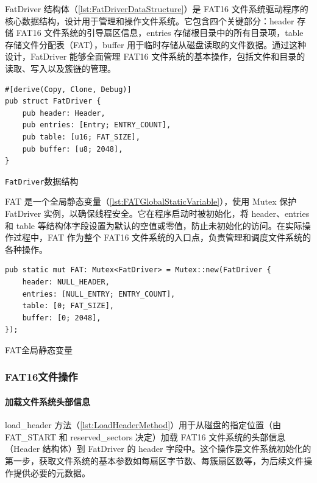 FatDriver 结构体（\cref{lst:FatDriverDataStructure}）是 FAT16 文件系统驱动程序的核心数据结构，设计用于管理和操作文件系统。它包含四个关键部分：header 存储 FAT16 文件系统的引导扇区信息，entries 存储根目录中的所有目录项，table 存储文件分配表（FAT），buffer 用于临时存储从磁盘读取的文件数据。通过这种设计，FatDriver 能够全面管理 FAT16 文件系统的基本操作，包括文件和目录的读取、写入以及簇链的管理。

\begin{listing}[htbp]
    \begin{verbatim}
#[derive(Copy, Clone, Debug)]
pub struct FatDriver {
    pub header: Header,
    pub entries: [Entry; ENTRY_COUNT],
    pub table: [u16; FAT_SIZE],
    pub buffer: [u8; 2048],
}
    \end{verbatim}
    \caption{\texttt{FatDriver}数据结构}\label{lst:FatDriverDataStructure}
\end{listing}

FAT 是一个全局静态变量（\cref{lst:FATGlobalStaticVariable}），使用 Mutex 保护 FatDriver 实例，以确保线程安全。它在程序启动时被初始化，将 header、entries 和 table 等结构体字段设置为默认的空值或零值，防止未初始化的访问。在实际操作过程中，FAT 作为整个 FAT16 文件系统的入口点，负责管理和调度文件系统的各种操作。

\begin{listing}[htbp]
    \begin{verbatim}
pub static mut FAT: Mutex<FatDriver> = Mutex::new(FatDriver {
    header: NULL_HEADER,
    entries: [NULL_ENTRY; ENTRY_COUNT],
    table: [0; FAT_SIZE],
    buffer: [0; 2048],
});
    \end{verbatim}
    \caption{FAT全局静态变量}\label{lst:FATGlobalStaticVariable}
\end{listing}

\subsubsection{FAT16文件操作}

\paragraph{加载文件系统头部信息}

load\_header 方法（\cref{lst:LoadHeaderMethod}）用于从磁盘的指定位置（由 FAT\_START 和 reserved\_sectors 决定）加载 FAT16 文件系统的头部信息（Header 结构体）到 FatDriver 的 header 字段中。这个操作是文件系统初始化的第一步，获取文件系统的基本参数如每扇区字节数、每簇扇区数等，为后续文件操作提供必要的元数据。


